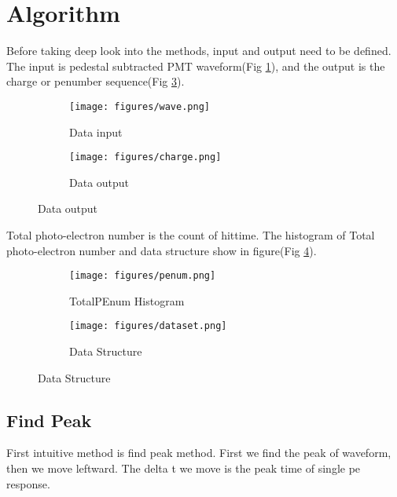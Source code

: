 \section{Algorithm} %

Before taking deep look into the methods, input and output need to be defined. The input is pedestal subtracted PMT waveform(Fig \ref{fig:input}), and the output is the charge or penumber sequence(Fig \ref{fig:output}). 

\begin{figure}[H]
\begin{minipage}{.5\textwidth}
\begin{figure}[H]
    \centering
        \texttt{[image: figures/wave.png]}
    \caption{Data input}
    \label{fig:input}
\end{figure}
\end{minipage}
\begin{minipage}{.5\textwidth}
\begin{figure}[H]
    \centering
        \texttt{[image: figures/charge.png]}
    \caption{Data output}
    \label{fig:output}
\end{figure}
\end{minipage}
\end{figure}

Total photo-electron number is the count of hittime. The histogram of Total photo-electron number and data structure show in figure(Fig \ref{fig:penum}). 

\begin{figure}[H]
\begin{minipage}{.5\textwidth}
\begin{figure}[H]
    \centering
        \texttt{[image: figures/penum.png]}
    \caption{TotalPEnum Histogram}
    \label{fig:penum}
\end{figure}
\end{minipage}
\begin{minipage}{.5\textwidth}
\begin{figure}[H]
    \centering
        \texttt{[image: figures/dataset.png]}
    \caption{Data Structure}
    \label{fig:set}
\end{figure}
\end{minipage}
\end{figure}

\subsection{Find Peak}
First intuitive method is find peak method. First we find the peak of waveform, then we move leftward. The delta t we move is the peak time of single pe response. 

